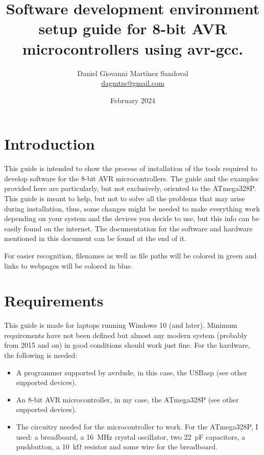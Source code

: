 \documentclass[10pt,letterpaper]{article}
\title{Software development environment setup guide for 8-bit AVR microcontrollers using avr-gcc.}
\author{Daniel Giovanni Martínez Sandoval\\ \small{\href{mailto:dagmtzs@gmail.com}{dagmtzs@gmail.com}}}
\date{February 2024}
\begin{document}
\maketitle
\newpage
\tableofcontents	

\section{Introduction}
This guide is intended to show the process of installation of the tools required to develop software for the 8-bit AVR microcontrollers. The guide and the examples provided here are particularly, but not exclusively, oriented to the ATmega328P. This guide is meant to help, but not to solve all the problems that may arise during installation, thus, some changes might be needed to make everything work depending on your system and the devices you decide to use, but this info can be easily found on the internet. The documentation for the software and hardware mentioned in this document can be found at the end of it. 

For easier recognition, filenames as well as file paths will be colored in {\color{ForestGreen}green} and links to webpages will be colored in {\color{blue}blue}.

\section{Requirements}
This guide is made for laptops running Windows 10 (and later). Minimum requirements have not been defined but almost any modern system (probably from 2015 and on) in good conditions should work just fine. For the hardware, the following is needed:
\begin{itemize}
    \item A programmer supported by avrdude, in this case, the USBasp (see other supported devices).
    \item An 8-bit AVR microcontroller, in my case, the ATmega328P (see other supported devices).
    \item The circuitry needed for the microcontroller to work. For the ATmega328P, I used: a breadboard, a \SI{16}{\mega\hertz} crystal oscillator, two \SI{22}{\pico\farad} capacitors, a pushbutton, a \SI{10}{\kilo\ohm} resistor and some wire for the breadboard.
\end{itemize}
\end{document}
